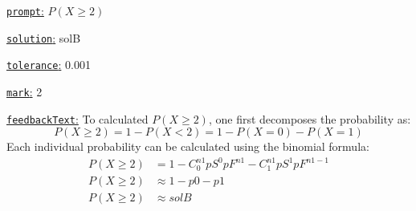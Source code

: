 \documentclass[preview]{standalone}
\newcommand \fieldname[1]{\underline{\texttt{#1}:}}
\begin{document}
\fieldname{prompt}
$P(X \ge 2)$

\fieldname{solution}
solB

\fieldname{tolerance}
0.001

\fieldname{mark}
2

\fieldname{feedbackText}
To calculated $P(X \ge 2)$, one first decomposes the probability as:
\[
P(X \ge 2) = 1 - P(X<2) = 1 - P(X=0) - P(X=1)
\]
Each individual probability can be calculated using the binomial formula:
\[
\begin{aligned}
P(X \ge 2) &= 1 - C^{{n1}}_0 {pS}^0 {pF}^{{n1}} - C^{{n1}}_1 {pS}^1 {pF}^{{n1}-1}\\
P(X \ge 2) &\approx 1 - {p0} - {p1} \\
P(X \ge 2) &\approx {solB} \\
\end{aligned}
\]

\end{document}
